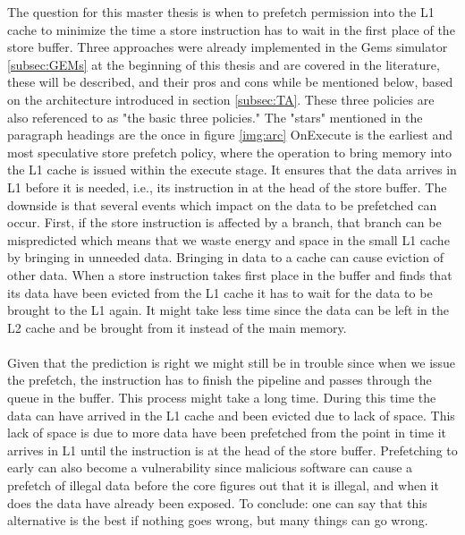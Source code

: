 The question for this master thesis is when to prefetch permission into the L1 cache to
minimize the time a store instruction has to wait in the first place of the store buffer. 
Three approaches were already implemented in the Gems simulator \ref{subsec:GEMs} at the beginning of this thesis and are covered in the literature,  these will
be described, and their pros and cons while be mentioned below, based on the architecture
introduced in section \ref{subsec:TA}. These three policies are also referenced to as "the basic three policies." The "stars" mentioned in the paragraph headings
are the once in figure \ref{img:arc}
 OnExecute \cite{ONEX} is the earliest and most speculative store prefetch policy, where the
operation to bring memory into the L1 cache is issued within the execute stage. It
ensures that the data arrives in L1 before it is needed, i.e., its instruction in at the head of the store buffer. The downside is that several events which impact on the data to be prefetched can
occur. First, if the store instruction is affected by a branch, that branch can
be mispredicted which means that we waste energy and space in the small L1 cache
by bringing in unneeded data. Bringing in data to a cache can cause eviction of
other data. When a store instruction takes first place in the buffer and finds that
its data have been evicted from the L1 cache it has to wait for the data to be brought
to the L1 again. It might take less time since the data can be left in the L2 cache and be brought from it instead of the main memory.
\\ \\
Given that the prediction
is right we might still be in trouble since when we issue the prefetch, the instruction
has to finish the pipeline and passes through the queue in the buffer. This process might
take a long time. During this time the data can have arrived in the L1 cache and been
evicted due to lack of space. This lack of space is due to more data have been prefetched from the point in
time it arrives in L1 until the instruction is at the head of the store buffer. Prefetching to early
can also become a vulnerability since malicious software can cause a prefetch of illegal data
before the core figures out that it is illegal, and when it does the data have already
been exposed. To conclude: one can say that this alternative is the best if nothing
goes wrong, but many things can go wrong. 

